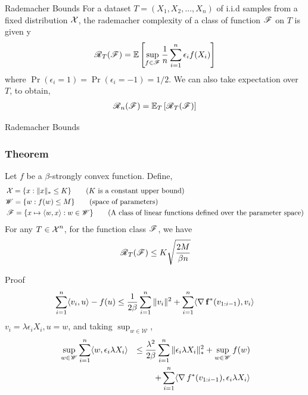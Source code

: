 \begin{frame}{Rademacher Bounds}
  For a dataset $T=(X_1,X_2,...,X_n)$ of i.i.d samples from a fixed distribution $\operatorname{\mathcal{X}}$, the rademacher complexity of a class of function $\operatorname{\mathscr{F}}$ on $T$ is given y
  \begin{align*}
    \operatorname{\mathscr{R}}_T(\operatorname{\mathscr{F}}) = \operatorname{\mathbb{E}} \left[ \sup_{f \in \operatorname{\mathscr{F}}} \frac{1}{n}\sum_{i=1}^n \epsilon_i f(X_i) \right]
  \end{align*}
  where $\Pr(\epsilon_i = 1) = \Pr(\epsilon_i = -1) = 1/2$.
  We can also take expectation over $T$, to obtain,
  \begin{align*}
    \operatorname{\mathscr{R}}_n(\operatorname{\mathscr{F}})=\operatorname{\mathbb{E}}_{T}\left[\operatorname{\mathscr{R}}_T(\operatorname{\mathscr{F}})\right]
  \end{align*}
\end{frame}

\begin{frame}{Rademacher Bounds}
    \frametitle{Theorem}
    Let $f$ be a $\beta$-strongly convex function. Define,
    \begin{align*}
      & \operatorname{\mathcal{X}} = \{ x : \|x\|_{*} \le K \} \tag{$K$ is a constant upper bound}\\
      & \mathscr{W} = \{w : f(w) \le M\} \tag{space of parameters}\\
      & \operatorname{\mathscr{F}} = \{ x \mapsto \langle {w} , {x} \rangle : w \in \mathscr{W} \} \tag{A class of linear functions defined over the parameter space}
    \end{align*}
    For any $T \in \operatorname{\mathcal{X}}^n$, for the function class $\operatorname{\mathscr{F}}$, we have
    \begin{align*}
      & \operatorname{\mathscr{R}}_T(\operatorname{\mathscr{F}}) \le K\sqrt{\frac{2M}{\beta n}} \\
    \end{align*}
\end{frame}

\begin{frame}{Proof}
    \begin{align*}
      \sum_{i=1}^n \langle {v_i} , {u} \rangle - f(u) \le \frac{1}{2\beta} \sum_{i=1}^n \|v_i\|^2 + \sum_{i=1}^n \langle {\operatorname{\nabla}{\operatorname{\mathbf{f}}}^{*}(v_{1:i-1})} , {v_i} \rangle
    \end{align*}
    $v_i=\lambda\epsilon_i X_i,u=w$, and taking $\sup_{w \in \mathscr{W}}$,
    \begin{alignat*}{2}
      & \sup_{w \in \mathscr{W}} \sum_{i=1}^n \langle {w} , {\epsilon_i \lambda X_i} \rangle & \le \frac{\lambda^2}{2\beta}\sum_{i=1}^n \|\epsilon_i \lambda X_i\|_{*}^2 + \sup_{w \in \mathscr{W}} f(w) \\
      & & + \sum_{i=1}^n \langle {\operatorname{\nabla}{f}^{*}(v_{1:i-1})} , {\epsilon_i \lambda X_i} \rangle
    \end{alignat*}
\end{frame}

